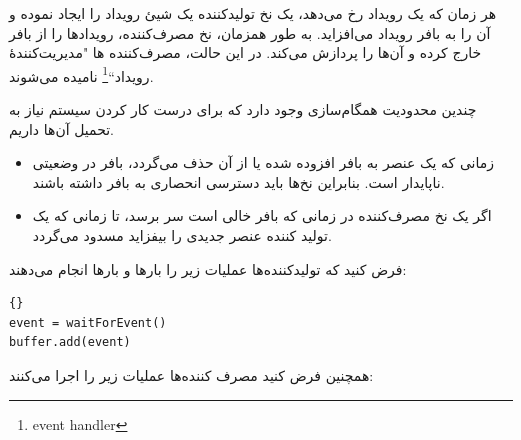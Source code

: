 \documentclass{book}
\begin{document}

    هر زمان که یک رویداد رخ می‌دهد، یک نخ تولید‌کننده یک شیئ رویداد را ایجاد نموده و آن را به بافر رویداد می‌افزاید. 
    به طور همزمان، نخ مصرف‌کننده، رویدادها را از بافر خارج کرده و آن‌ها را پردازش می‌کند. 
    در این حالت، مصرف‌کننده ها "مدیریت‌کنندهٔ رویداد``\footnote{event handler} نامیده می‌شوند.

    چندین محدودیت همگام‌سازی وجود دارد که برای درست کار کردن سیستم نیاز به تحمیل آن‌ها داریم.

\begin{itemize}

\item 
    زمانی که یک عنصر به بافر افزوده شده یا از آن حذف می‌گردد، بافر در وضعیتی ناپایدار است.
    بنابراین نخ‌ها باید دسترسی انحصاری به بافر داشته باشند.
    
\item 
    اگر یک نخ مصرف‌کننده در زمانی که بافر خالی است سر برسد، تا زمانی که یک تولید کننده عنصر جدیدی را بیفزاید مسدود می‌گردد.

\end{itemize}

    فرض کنید که تولیدکننده‌ها عملیات زیر را بارها و بارها انجام می‌دهند:

\begin{latin}
\begin{latin}
\begin{lstlisting}[title=\rl{کد پایه تولیدکننده}]{}
event = waitForEvent()
buffer.add(event)
\end{lstlisting}
\end{latin}
\end{latin}

    همچنین فرض کنید مصرف کننده‌ها عملیات زیر را اجرا می‌کنند:
\end{document}
